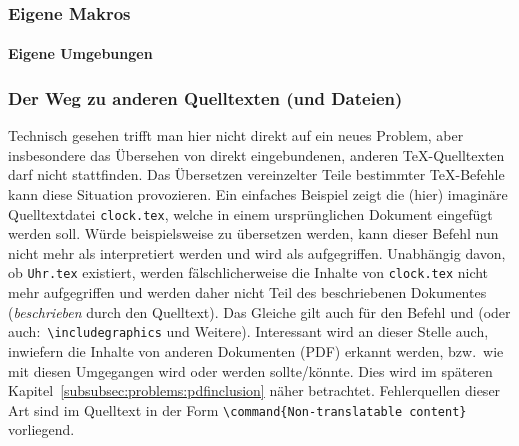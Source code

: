 \subsubsection{Eigene Makros}
\paragraph*{Eigene Umgebungen}\label{subsubsec:problems:uniqueenvironments}


\subsubsection{Der Weg zu anderen Quelltexten (und Dateien)}%
Technisch gesehen trifft man hier nicht direkt auf ein neues Problem, aber insbesondere das Übersehen von direkt eingebundenen, anderen \TeX{}-Quelltexten darf nicht stattfinden. Das Übersetzen vereinzelter Teile bestimmter \TeX{}-Befehle kann diese Situation provozieren. Ein einfaches Beispiel zeigt die (hier) imaginäre Quelltextdatei \texttt{clock.tex}, welche in einem ursprünglichen Dokument eingefügt werden soll.  
Würde beispielsweise \verb|| zu \verb|| übersetzen werden, kann dieser Befehl nun nicht mehr als \verb|| interpretiert werden und wird als \verb|| aufgegriffen. Unabhängig davon, ob \texttt{Uhr.tex} existiert, werden fälschlicherweise die Inhalte von \texttt{clock.tex} nicht mehr aufgegriffen und werden daher nicht Teil des beschriebenen Dokumentes (\textit{beschrieben} durch den Quelltext).
Das Gleiche gilt auch für den Befehl \verb|| und \verb|| (oder auch:\ \verb|\includegraphics| und Weitere). Interessant wird an dieser Stelle auch, inwiefern die Inhalte von anderen Dokumenten (PDF) erkannt werden, bzw.\ wie mit diesen Umgegangen wird oder werden sollte/könnte. Dies wird im späteren Kapitel~\ref{subsubsec:problems:pdfinclusion} näher betrachtet.
Fehlerquellen dieser Art sind im Quelltext in der Form \verb|\command{Non-translatable content}| vorliegend.

\newpage


